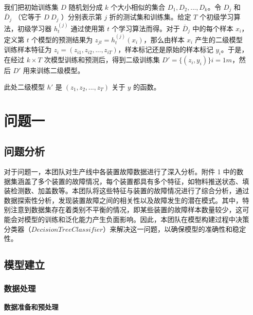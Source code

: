 \documentclass[withoutpreface,bwprint]{cumcmthesis}
\begin{document}
\hspace{1em}

我们把初始训练集 \( D \) 随机划分成 \( k \) 个大小相似的集合 \( D_1 , D_2 , . . . , D_k \)。令 \( D_j \) 和 \( \bar{D}_j \) （它等于 \( D \ D_j \) ）分别表示第 \( j \) 折的测试集和训练集。给定 \( T \) 个初级学习算法，初级学习器 \( h_t^{(j)} \) 通过使用第 \( t \) 个学习算法而得。对于 \( \bar{D}_j \) 中的每个样本 \( x_i \)，定义第 \( t \) 个模型的预测结果为 \( z_{jt} = h_t^{(j)}(x_i) \)，那么由样本 \( x_i \) 产生的二级模型训练样本特征为 \( z_i = ( z_{i1} , z_{i2} , . . . , z_{iT} ) \)，样本标记还是原始的样本标记 \( y_i \)。于是，在经过 \( k \times T \) 次模型训练和预测后，得到二级训练集 \( D' = \{ ( z_i , y_i ) \} i = 1 m \)，然后 \( D' \) 用来训练二级模型。

此处二级模型 \( h' \) 是 \( ( z_1 , z_2 , . . . , z_T ) \) 关于 \( y \) 的函数。


\newpage
\section{问题一}

\subsection{问题分析}

对于问题一，本团队对生产线中各装置故障数据进行了深入分析。附件 1 中的数据集涵盖了多个装置的故障情况，每个装置都具有多个特征，如物料推送状态、填装检测数、加盖数等。本团队将这些特征与装置的故障情况进行了综合分析，通过数据探索性分析，发现装置故障之间的相关性以及故障发生的潜在模式。其中，特别注意到数据集存在着类别不平衡的情况，即某些装置的故障样本数量较少，这可能会对模型的训练和泛化能力产生负面影响。因此，本团队在模型构建过程中决策分类器（\(DecisionTreeClassifier\)）来解决这一问题，以确保模型的准确性和稳定性。

\subsection{模型建立}

\subsubsection{数据处理}

\vspace{1em}

\textbf{数据准备和预处理}
\vspace{1em}
\end{document}
